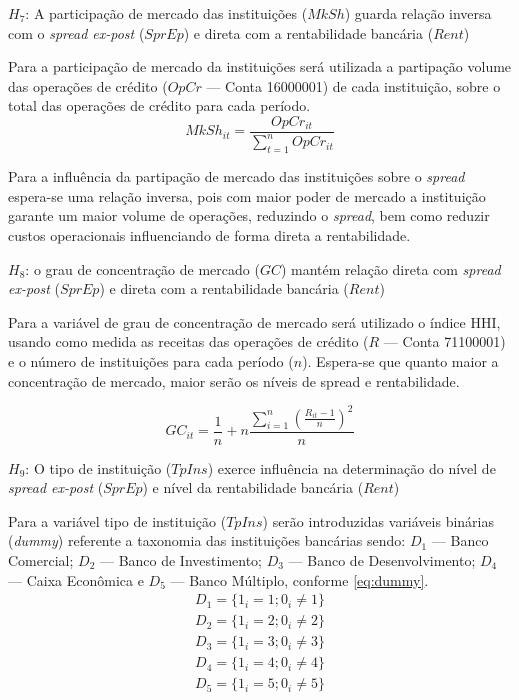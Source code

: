 \documentclass[12pt,12pt,openright,oneside,a4paper,chapter=TITLE,section=TITLE,subsection=TITLE,subsubsection=TITLE english,french,spanish,portugues,sumario=tradicional]{abntex2}
\begin{document}
\(H_7\): A participação de mercado das instituições (\(MkSh\)) guarda relação inversa com o \emph{spread ex-post} (\(SprEp\)) e direta com a rentabilidade bancária (\(Rent\))

Para a participação de mercado da instituições será utilizada a partipação volume das operações de crédito (\(OpCr\) --- Conta 16000001) de cada instituição, sobre o total das operações de crédito para cada período.
\[
MkSh_{it} = \frac{OpCr_{it}}{\sum_{t=1}^nOpCr_{it}}
\]

Para a influência da partipação de mercado das instituições sobre o \emph{spread} espera-se uma relação inversa, pois com maior poder de mercado a instituição garante um maior volume de operações, reduzindo o \emph{spread}, bem como reduzir custos operacionais influenciando de forma direta a rentabilidade.

\(H_8\): o grau de concentração de mercado (\(GC\)) mantém relação direta com \emph{spread ex-post} (\(SprEp\)) e direta com a rentabilidade bancária (\(Rent\))

Para a variável de grau de concentração de mercado será utilizado o índice HHI, usando como medida as receitas das operações de crédito (\(R\) --- Conta 71100001) e o número de instituições para cada período (\(n\)). Espera-se que quanto maior a concentração de mercado, maior serão os níveis de spread e rentabilidade.

\[
GC_{it} = \frac{1}{n} + n\frac{\sum_{i=1}^{n}(\frac{R_{it} - 1}{n})^2}{n}
\]

\(H_9\): O tipo de instituição (\(TpIns\)) exerce influência na determinação do nível de \emph{spread ex-post} (\(SprEp\)) e nível da rentabilidade bancária (\(Rent\))

Para a variável tipo de instituição (\(TpIns\)) serão introduzidas variáveis binárias (\emph{dummy}) referente a taxonomia das instituições bancárias sendo: \(D_{1}\) --- Banco Comercial; \(D_{2}\) --- Banco de Investimento; \(D_{3}\) --- Banco de Desenvolvimento; \(D_{4}\) --- Caixa Econômica e \(D_{5}\) --- Banco Múltiplo, conforme \autoref{eq:dummy}.
\[\begin{aligned}
D_{1} = \lbrace 1_{i} = 1 ; 0_{i} \neq 1 \rbrace \\
D_{2} = \lbrace 1_{i} = 2 ; 0_{i} \neq 2 \rbrace \\
D_{3} = \lbrace 1_{i} = 3 ; 0_{i} \neq 3 \rbrace \\
D_{4} = \lbrace 1_{i} = 4 ; 0_{i} \neq 4 \rbrace \\
D_{5} = \lbrace 1_{i} = 5 ; 0_{i} \neq 5 \rbrace
\end{aligned}\]
\end{document}
